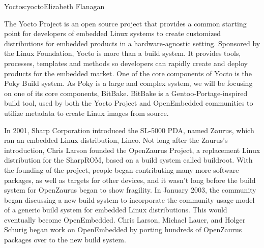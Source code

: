 \begin{aosachapter}{Yocto}{s:yocto}{Elizabeth Flanagan}


%
%

The Yocto Project is an open source
project that provides a common starting point for
developers of embedded Linux systems to create customized
distributions for embedded products in a hardware-agnostic
setting. Sponsored by the Linux Foundation, Yocto is more than a
build system. It provides tools, processes, templates and methods so
developers can rapidly create and deploy products for the embedded
market. One of the core components of Yocto is the Poky Build
system. As Poky is a large and complex system, we will be focusing on
one of its core components, BitBake.  BitBake is a Gentoo-Portage-inspired 
build tool, used by both the Yocto Project and OpenEmbedded
communities to utilize metadata to create Linux images from
source.

In 2001, Sharp Corporation introduced the SL-5000 PDA, named Zaurus,
which ran an embedded Linux distribution, Lineo. Not long after the
Zaurus's introduction, Chris Larson founded the OpenZaurus Project, a
replacement Linux distribution for the SharpROM, based on a build
system called buildroot. With the founding of the project, people
began contributing many more software packages, as well as targets for
other devices, and it wasn't long before the build system for OpenZaurus
began to show fragility. In January 2003, the community began
discussing a new build system to incorporate the community usage model
of a generic build system for embedded Linux distributions. This would
eventually become OpenEmbedded. Chris Larson, Michael Lauer, and
Holger Schurig began work on OpenEmbedded by porting hundreds of
OpenZaurus packages over to the new build system.


\end{aosachapter}
